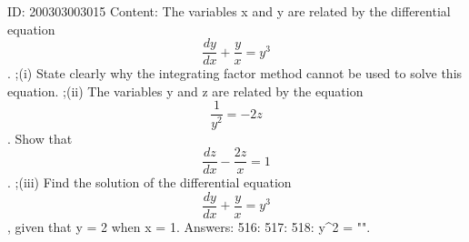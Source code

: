 \documentclass{article}
\begin{document}
ID: 200303003015
Content:
The variables x and y are related by the differential equation  $$\frac{dy}{dx}+\frac{y}{x} = y^3 $$. ;(i) State clearly why the integrating factor method cannot be used to solve this equation. ;(ii) The variables y and z are related by the equation  $$\frac{1}{y^2} = -2z$$. Show that  $$\frac{dz}{dx} - \frac{2z}{x} = 1$$. ;(iii) Find the solution of the differential equation  $$\frac{dy}{dx} + \frac{y}{x} = y^3 $$, given that y = 2 when x = 1.  Answers:
516: 
517: 
518: y^2 = "".
\end{document}
